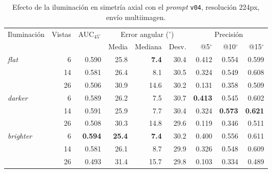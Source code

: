\begin{table}[H]
\centering
\caption{Efecto de la iluminación en simetría axial con el \textit{prompt} \texttt{v04}, resolución 224px, envío multiimagen.}
\label{tab:nov_axis_iluminacion}
\footnotesize
\setlength{\tabcolsep}{3pt}
\renewcommand{\arraystretch}{0.95}

\begin{tabular*}{\textwidth}{@{\extracolsep{\fill}}lrrrrrrrr@{}}
\toprule
\multirow{2}{*}{Iluminación} & \multirow{2}{*}{Vistas} & \multirow{2}{*}{AUC$_{45^\circ}$} & \multicolumn{3}{c}{Error angular ($^\circ$)} & \multicolumn{3}{c}{Precisión} \\
\cmidrule(lr){4-6} \cmidrule(lr){7-9}
 &  &  & Media & Mediana & Desv. & @5$^\circ$ & @10$^\circ$ & @15$^\circ$ \\
\midrule
\multirow{3}{*}{\textit{flat}} & 6 & 0.590 & 25.8 & \textbf{7.4} & 30.4 & 0.412 & 0.554 & 0.599 \\
 & 14 & 0.581 & 26.4 & 8.1 & 30.5 & 0.324 & 0.549 & 0.608 \\
 & 26 & 0.506 & 30.9 & 14.6 & 30.2 & 0.131 & 0.358 & 0.509 \\
\midrule
\multirow{3}{*}{\textit{darker}} & 6 & 0.589 & 26.2 & 7.5 & 30.7 & \textbf{0.413} & 0.545 & 0.602 \\
 & 14 & 0.591 & 25.9 & 7.7 & 30.4 & 0.324 & \textbf{0.573} & \textbf{0.621} \\
 & 26 & 0.508 & 30.3 & 14.8 & 29.6 & 0.119 & 0.346 & 0.511 \\
\midrule
\multirow{3}{*}{\textit{brighter}} & 6 & \textbf{0.594} & \textbf{25.4} & \textbf{7.4} & 30.2 & 0.400 & 0.556 & 0.611 \\
 & 14 & 0.581 & 26.1 & 8.7 & 29.9 & 0.326 & 0.548 & 0.609 \\
 & 26 & 0.493 & 31.4 & 15.7 & 29.8 & 0.103 & 0.334 & 0.489 \\
\bottomrule
\end{tabular*}

\vspace{2ex}


\end{table}
